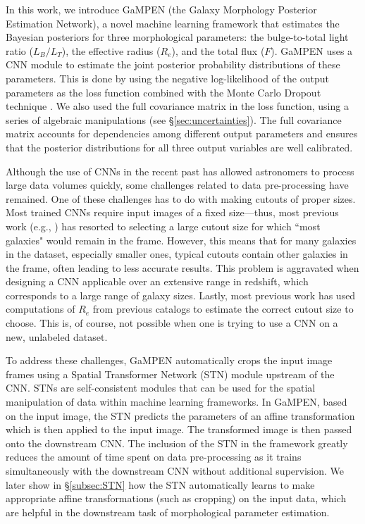 \documentclass[twocolumn]{aastex63}
\newcommand\gampen{GaMPEN}
\begin{document}
\begin{CJK*}{UTF8}{gbsn}
In this work, we introduce \gampen{} (the Galaxy Morphology Posterior Estimation Network), a novel machine learning framework that estimates the Bayesian posteriors for three morphological parameters: the bulge-to-total light ratio ($L_B/L_T$), the effective radius ($R_e$), and the total flux ($F$).
\gampen{} uses a %
CNN module to estimate the joint posterior probability distributions of these parameters. This is done by using the negative log-likelihood of the output parameters as the loss function combined with the Monte Carlo Dropout technique \citep{gal_2016}. We also used the full covariance matrix in the loss function, using a series of algebraic manipulations (see \S \ref{sec:uncertainties}). The full covariance matrix accounts for dependencies among different output parameters and ensures that the posterior distributions for all three output variables are well calibrated.

Although the use of CNNs in the recent past has allowed astronomers to process large data volumes quickly, some challenges related to data pre-processing have remained. One of these challenges has to do with making cutouts of proper sizes. Most trained CNNs require input images of a fixed size---thus, most previous work (e.g., \citealp{Cheng2021GalaxyNetworks, Vega-Ferrero2021PushingSurvey}) has resorted to selecting a large cutout size for which ``most galaxies" would remain in the frame. However, this means that for many galaxies in the dataset, especially smaller ones, typical cutouts contain other galaxies in the frame, often leading to less accurate results. This problem is aggravated when designing a CNN applicable over an extensive range in redshift, which corresponds to a large range of galaxy sizes. Lastly, most previous work has used computations of $R_e$ from previous catalogs to estimate the correct cutout size to choose. This is, of course, not possible when one is trying to use a CNN on a new, unlabeled dataset. 

To address these challenges, \gampen{} automatically crops the input image frames using a Spatial Transformer Network (STN) module upstream of the CNN. STNs are self-consistent modules that can be used for the spatial manipulation of data within machine learning frameworks. In \gampen{}, based on the input image, the STN predicts the parameters of an affine transformation which is then applied to the input image. The transformed image is then passed onto the downstream CNN.
The inclusion of the STN in the framework greatly reduces the amount of time spent on data pre-processing as it trains simultaneously with the downstream CNN without additional supervision. We later show in \S \ref{subsec:STN} how the STN automatically learns to make appropriate affine transformations (such as cropping) on the input data, which are helpful in the downstream task of morphological parameter estimation.


\end{CJK*}
\end{document}
